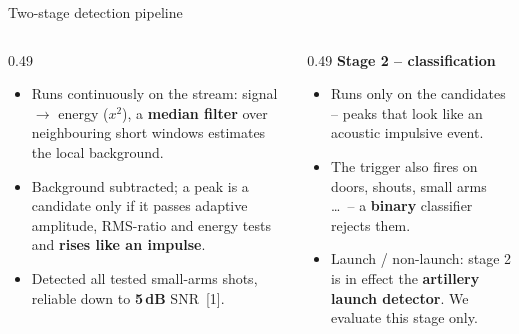 \documentclass[aspectratio=169,10pt]{beamer}
\begin{document}
\begin{frame}{Two-stage detection pipeline}
\begin{columns}[T,onlytextwidth]
\begin{column}{0.49\textwidth}
      \begin{itemize}\scriptsize
        \item Runs continuously on the stream: signal $\rightarrow$ energy ($x^2$), a
              \textbf{median filter} over neighbouring short windows estimates the local
              background.
        \item Background subtracted; a peak is a candidate only if it passes adaptive
              amplitude, RMS-ratio and energy tests and \textbf{rises like an impulse}.
        \item Detected all tested small-arms shots, reliable down to \textbf{5\,dB} SNR~[1].
      \end{itemize}
    \end{column}
    \begin{column}{0.49\textwidth}
      {\small\bfseries\color{accent}Stage 2 -- classification}
      \begin{itemize}\scriptsize
        \item Runs only on the candidates -- peaks that look like an acoustic impulsive
              event.
        \item The trigger also fires on doors, shouts, small arms \ldots\ -- a
              \textbf{binary} classifier rejects them.
        \item Launch / non-launch: stage 2 is in effect the
              \textbf{artillery launch detector}. We evaluate this stage only.
      \end{itemize}
    \end{column}
  \end{columns}
\end{frame}
\end{document}
